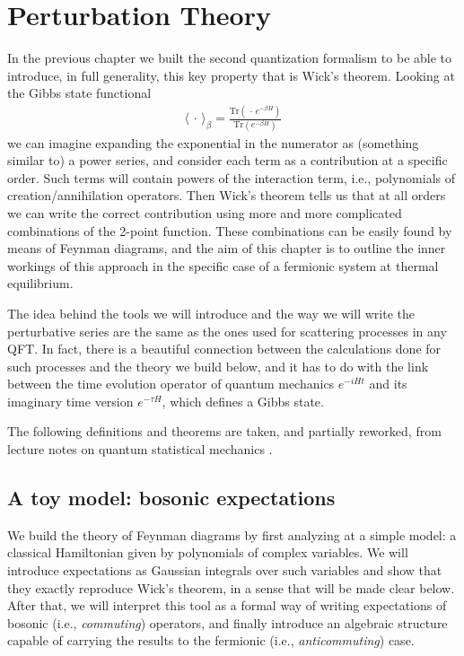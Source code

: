 \chapter{Perturbation Theory}
\label{perturbation-theory}

In the previous chapter we built the second quantization formalism to be able to introduce, in
full generality, this key property that is Wick's theorem. Looking at the Gibbs state functional
\begin{align*}
	\langle\,\cdot\,\rangle_\beta=\frac{\mathrm{Tr}(\,\cdot\,e^{-\beta H})}{\mathrm{Tr}(e^{-\beta H})}
\end{align*}
we can imagine expanding the exponential in the numerator as (something similar to) a power
series, and consider each term as a contribution at a specific order. Such terms will contain
powers of the interaction term, i.e., polynomials of creation/annihilation operators. Then
Wick's theorem tells us that at all orders we can write the correct contribution using more
and more complicated combinations of the 2-point function. These combinations can be easily
found by means of Feynman diagrams, and the aim of this chapter is to outline the inner
workings of this approach in the specific case of a fermionic system at thermal equilibrium.
\begin{remark}
The idea behind the tools we will introduce and the way we will write the perturbative series
are the same as the ones used for scattering processes in any QFT. In fact, there is a beautiful
connection between the calculations done for such processes and the theory we build below, and
it has to do with the link between the time evolution operator of quantum mechanics $e^{-iHt}$
and its imaginary time version $e^{-\tau H}$, which defines a Gibbs state.
\end{remark}
The following definitions and theorems are taken, and partially reworked, from lecture notes
on quantum statistical mechanics \cite{GalNotes}.

\section{A toy model: bosonic expectations}
\label{sec:toy-model}

We build the theory of Feynman diagrams by first analyzing at a simple model: a classical
Hamiltonian given by polynomials of complex variables. We will introduce expectations
as Gaussian integrals over such variables and show that they exactly reproduce Wick's theorem,
in a sense that will be made clear below. After that, we will interpret this tool as a formal
way of writing expectations of bosonic (i.e., \textit{commuting}) operators, and finally
introduce an algebraic structure capable of carrying the results to the fermionic (i.e.,
\textit{anticommuting}) case.

